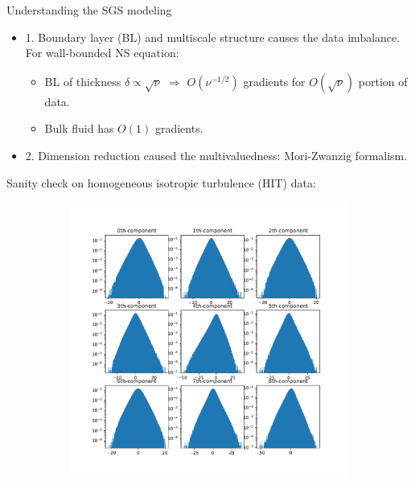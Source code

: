 \documentclass[aspectratio=169]{beamer}
\begin{document}
\begin{frame}{Understanding the SGS modeling}
	\begin{itemize}
		\item 1. {\color{red}
		Boundary layer (BL) and multiscale structure causes the data imbalance.} For
		wall-bounded NS equation:
		\begin{itemize}
			\item BL of thickness $\delta \propto \sqrt{\nu}$ $\Longrightarrow$
			$O(\nu^{-1/2})$ gradients for $O(\sqrt{\nu})$ portion of data.
			\item Bulk fluid has $O(1)$ gradients.
		\end{itemize}
		\item 2. Dimension reduction caused the multivaluedness: Mori-Zwanzig formalism.
	\end{itemize}

	Sanity check on homogeneous isotropic turbulence (HIT) data:
	\begin{figure}[ht]
     \centering
			\begin{subfigure}[b]{0.55\textwidth}
				\centering 
				\includegraphics[width=\textwidth]
				{fig/HIT_hist_S.pdf} 
			\end{subfigure}
			\end{figure}
\end{frame}
\end{document}
